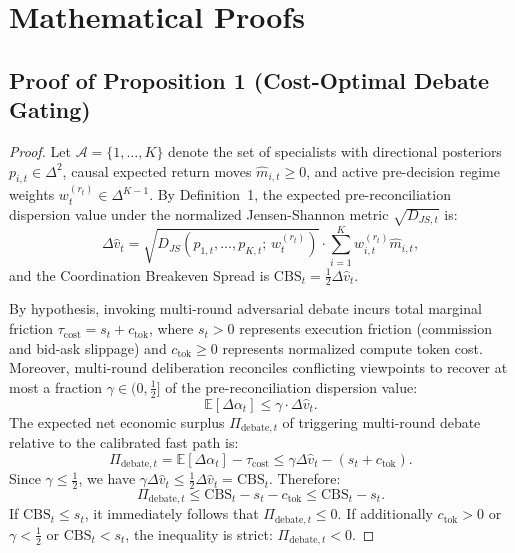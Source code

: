 \documentclass[10pt,a4paper,twocolumn]{article}
\begin{document}
\appendix
\balance
\section{Mathematical Proofs}
\label{app:proofs}

\subsection{Proof of Proposition 1 (Cost-Optimal Debate Gating)}
\begin{proof}
Let $\mathcal{A} = \{1, \dots, K\}$ denote the set of specialists with directional posteriors $p_{i,t} \in \Delta^2$, causal expected return moves $\hat{m}_{i,t} \ge 0$, and active pre-decision regime weights $w_t^{(r_t)} \in \Delta^{K-1}$. By Definition~1, the expected pre-reconciliation dispersion value under the normalized Jensen-Shannon metric $\sqrt{D_{JS,t}}$ is:
\begin{equation}
  \Delta \hat{v}_t = \sqrt{D_{JS}\!\left(p_{1,t}, \dots, p_{K,t}; \, w_t^{(r_t)}\right)} \cdot \sum_{i=1}^K w_{i,t}^{(r_t)} \hat{m}_{i,t},
\end{equation}
and the Coordination Breakeven Spread is $\text{CBS}_t = \frac{1}{2}\Delta \hat{v}_t$.

By hypothesis, invoking multi-round adversarial debate incurs total marginal friction $\tau_{\text{cost}} = s_t + c_{\text{tok}}$, where $s_t > 0$ represents execution friction (commission and bid-ask slippage) and $c_{\text{tok}} \ge 0$ represents normalized compute token cost. Moreover, multi-round deliberation reconciles conflicting viewpoints to recover at most a fraction $\gamma \in (0, \frac{1}{2}]$ of the pre-reconciliation dispersion value:
\begin{equation}
  \mathbb{E}\left[\Delta \alpha_t\right] \le \gamma \cdot \Delta \hat{v}_t.
\end{equation}
The expected net economic surplus $\Pi_{\text{debate}, t}$ of triggering multi-round debate relative to the calibrated fast path is:
\begin{equation}
  \Pi_{\text{debate}, t} = \mathbb{E}\left[\Delta \alpha_t\right] - \tau_{\text{cost}} \le \gamma \Delta \hat{v}_t - (s_t + c_{\text{tok}}).
\end{equation}
Since $\gamma \le \frac{1}{2}$, we have $\gamma \Delta \hat{v}_t \le \frac{1}{2}\Delta \hat{v}_t = \text{CBS}_t$. Therefore:
\begin{equation}
  \Pi_{\text{debate}, t} \le \text{CBS}_t - s_t - c_{\text{tok}} \le \text{CBS}_t - s_t.
\end{equation}
If $\text{CBS}_t \le s_t$, it immediately follows that $\Pi_{\text{debate}, t} \le 0$. If additionally $c_{\text{tok}} > 0$ or $\gamma < \frac{1}{2}$ or $\text{CBS}_t < s_t$, the inequality is strict: $\Pi_{\text{debate}, t} < 0$.


\end{proof}
\end{document}
